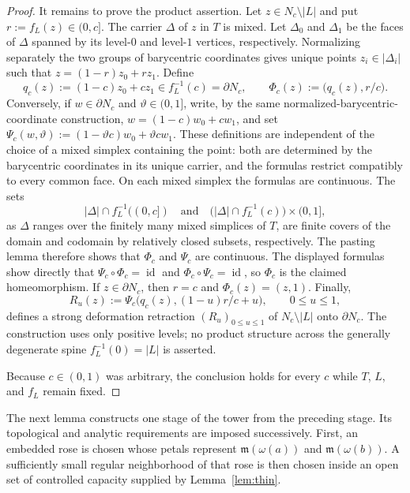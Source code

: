 \documentclass[12pt,oneside,a4paper]{article}
\theoremstyle{mytheorem}
\theoremstyle{remark}
\theoremstyle{definition}
\begin{document}
\begin{proof}
It remains to prove the product assertion.  Let
$z\in N_c\setminus|L|$ and put $r:=f_L(z)\in(0,c]$.  The carrier
$\Delta$ of $z$ in $T$ is mixed.  Let $\Delta_0$ and $\Delta_1$ be the
faces of $\Delta$ spanned by its level-$0$ and level-$1$ vertices,
respectively.  Normalizing separately the two groups of barycentric
coordinates gives unique points $z_i\in|\Delta_i|$ such that
$z=(1-r)z_0+rz_1$.
Define
\[
 q_c(z):=(1-c)z_0+cz_1\in f_L^{-1}(c)=\partial N_c,
 \qquad
 \Phi_c(z):=\bigl(q_c(z),r/c\bigr).
\]
Conversely, if $w\in\partial N_c$ and $\vartheta\in(0,1]$, write, by the same
normalized-barycentric-coordinate construction,
$w=(1-c)w_0+cw_1$, and set
$\Psi_c(w,\vartheta):=(1-\vartheta c)w_0+\vartheta c w_1$.
These definitions are independent of the choice of a mixed simplex containing the
point: both are determined by the barycentric coordinates in its unique
carrier, and the formulas restrict compatibly to every common face.
On each mixed simplex the formulas are continuous.  The sets
\[
 |\Delta|\cap f_L^{-1}((0,c])
 \quad\text{and}\quad
 \bigl(|\Delta|\cap f_L^{-1}(c)\bigr)\times(0,1],
\]
as $\Delta$ ranges over the finitely many mixed simplices of $T$, are
finite covers of the domain and codomain by relatively closed subsets,
respectively.  The
pasting lemma therefore shows that $\Phi_c$ and $\Psi_c$ are continuous.
The displayed formulas show directly that
$\Psi_c\circ\Phi_c=\operatorname{id}$ and
$\Phi_c\circ\Psi_c=\operatorname{id}$, so $\Phi_c$ is the claimed
homeomorphism.  If $z\in\partial N_c$, then $r=c$ and
$\Phi_c(z)=(z,1)$.  Finally,
\[
 R_u(z):=\Psi_c\bigl(q_c(z),(1-u)r/c+u\bigr),
 \qquad 0\leq u\leq1,
\]
defines a strong deformation retraction
$(R_u)_{0\leq u\leq1}$ of $N_c\setminus|L|$ onto
$\partial N_c$.  The construction uses only positive levels; no product
structure across the generally degenerate spine $f_L^{-1}(0)=|L|$ is
asserted.

Because $c\in(0,1)$ was arbitrary, the conclusion holds for every $c$
while $T$, $L$, and $f_L$ remain fixed.
\end{proof}



The next lemma constructs one stage of the tower from the preceding stage.
Its topological and analytic requirements are imposed successively.  First,
an embedded rose is chosen whose petals represent $\mathfrak{m}(\omega(a))$ and
$\mathfrak{m}(\omega(b))$.  A sufficiently small regular neighborhood of that
rose is then chosen inside an open set of controlled capacity supplied by
Lemma~\ref{lem:thin}.
\end{document}
